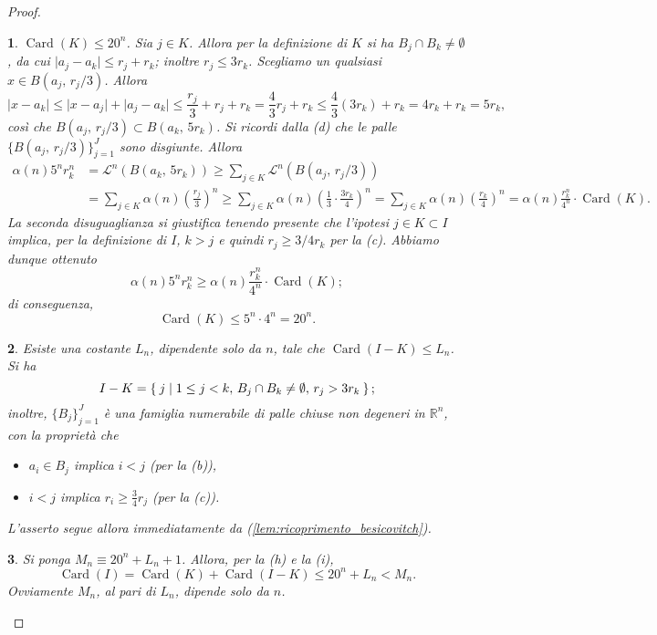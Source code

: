 \documentclass[a4paper,10pt,openright,oneside]{book}
\theoremstyle{theoremstyle}
\theoremstyle{theoremstylewoheader}
\theoremstyle{theoremstyle}
\theoremstyle{proofsecstyle}
\newtheorem{proofsec}{}
\theoremstyle{nonumberplain}
\newtheorem{proof}{Dim.}
\newcommand{\RR}{\ensuremath{\mathbb{R}}}
\newcommand{\Leb}{\ensuremath{\mathcal{L}}}
\newcommand{\abs}[1]{\ensuremath{\lvert #1 \rvert}}
\DeclareMathOperator{\Card}{Card}
\begin{document}
\begin{proof}
\begin{proofsec}
$\Card(K) \le 20^n$.\hspace{.5em} Sia $j \in K$. Allora per la definizione di $K$ si ha $B_j \cap B_k \ne \emptyset$, da cui $\abs{a_j - a_k} \le r_j + r_k$; inoltre $r_j \le 3r_k$. Scegliamo un qualsiasi $x \in B(a_j,\, r_j/3)$. Allora
\[
\abs{x - a_k} \le \abs{x - a_j} + \abs{a_j - a_k} \le \frac{r_j}{3} + r_j + r_k = \frac{4}{3}r_j + r_k \le \frac{4}{3}(3r_k) + r_k = 4r_k + r_k = 5r_k,
\]
così che $B(a_j,\, r_j/3) \subset B(a_k,\, 5r_k)$. Si ricordi dalla (d) che le palle $\{B(a_j,\, r_j/3)\}_{j=1}^J$ sono disgiunte. Allora
\begin{align*}
\alpha(n) 5^n r_k^n &= \Leb^n(B(a_k,\, 5r_k)) \ge \sum_{j \in K} \Leb^n(B(a_j,\, r_j/3))\\
&= \sum_{j \in K} \alpha(n) \left(\frac{r_j}{3}\right)^n \ge \sum_{j \in K} \alpha(n) \left(\frac{1}{3} \cdot \frac{3r_k}{4}\right)^n = \sum_{j \in K} \alpha(n) \left(\frac{r_k}{4}\right)^n = \alpha(n) \frac{r_k^n}{4^n} \cdot \Card(K).
\end{align*}
La seconda disuguaglianza si giustifica tenendo presente che l'ipotesi $j \in K \subset I$ implica, per la definizione di $I$, $k > j$ e quindi $r_j \ge 3/4r_k$ per la (c). Abbiamo dunque ottenuto
\[
\alpha(n) 5^n r_k^n \ge \alpha(n) \frac{r_k^n}{4^n} \cdot \Card(K);
\]
di conseguenza,
\[
\Card(K) \le 5^n \cdot 4^n = 20^n.
\]
\end{proofsec}

\begin{proofsec}
\emph{Esiste una costante $L_n$, dipendente solo da $n$, tale che $\Card(I - K) \le L_n$.}\hspace{.5em} Si ha
\[
I - K = \Set{ j | 1 \le j < k,\, B_j \cap B_k \ne \emptyset,\, r_j > 3r_k };
\]
inoltre, $\{B_j\}_{j=1}^J$ è una famiglia numerabile di palle chiuse non degeneri in $\RR^n$, con la proprietà che
\begin{itemize}
\item[($\alpha$)] $a_i \in B_j$ implica $i < j$ (per la (b)),
\item[($\beta$)] $i < j$ implica $r_i \ge \frac{3}{4} r_j$ (per la (c)).
\end{itemize}
L'asserto segue allora immediatamente da (\ref{lem:ricoprimento_besicovitch}).
\end{proofsec}

\begin{proofsec}
Si ponga $M_n \equiv 20^n + L_n + 1$. Allora, per la (h) e la (i),
\[
\Card(I) = \Card(K) + \Card(I - K) \le 20^n + L_n < M_n.
\]
Ovviamente $M_n$, al pari di $L_n$, dipende solo da $n$.
\end{proofsec}


\end{proof}
\end{document}
